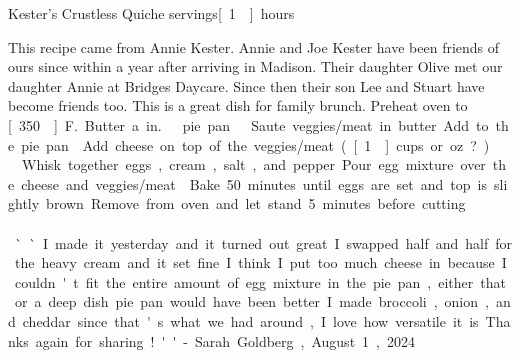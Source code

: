 \begin{recipe}{Kester's Crustless Quiche}
{\unit[6]{servings}}{\unit[1]{hours}}

\freeform This recipe came from Annie Kester. Annie and Joe Kester have been
friends of ours since within a year after arriving in Madison. Their daughter
Olive met our daughter Annie at Bridges Daycare. Since then their son
Lee and Stuart have become friends too. This is a great dish for
family brunch. Preheat oven to \unit[350\0]{F.} Butter a \unit[9]{in.}\
pie pan.

Saute veggies/meat in butter. Add to the pie pan.
Add cheese on top of the veggies/meat. (\unit[1\fr12]{cups} or \unit[6]{oz}?)
\ing[6]{}{eggs}
Whisk together eggs, cream, salt, and pepper. Pour egg mixture over
the cheese and veggies/meat.
\freeform Bake 50 minutes until eggs are set and top is
slightly brown.  Remove from oven and let stand 5 minutes before
cutting.\\\\
``I made it yesterday and it turned out great. I swapped half
and half for the heavy cream and it set fine. I think I put too much
cheese in because I couldn't fit the entire amount of egg mixture in
the pie pan, either that or a deep dish pie pan would have been
better. I made broccoli, onion, and cheddar since that's what we had
around, I love how versatile it is. Thanks again for sharing!'' - Sarah Goldberg, August 1, 2024
\end{recipe}
